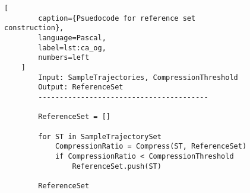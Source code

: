\begin{figure}[t]
    \begin{lstlisting}[
        caption={Psuedocode for reference set construction},
        language=Pascal,
        label=lst:ca_og,
        numbers=left
    ]
        Input: SampleTrajectories, CompressionThreshold
        Output: ReferenceSet
        ----------------------------------------

        ReferenceSet = []

        for ST in SampleTrajectorySet
            CompressionRatio = Compress(ST, ReferenceSet)
            if CompressionRatio < CompressionThreshold 
                ReferenceSet.push(ST)

        ReferenceSet
    \end{lstlisting}
\end{figure}